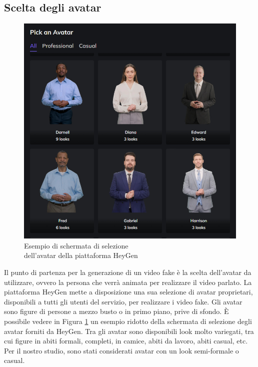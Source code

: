 
\subsection{Scelta degli avatar}

\begin{figure}[t]
    \centering
    \includegraphics[width=0.62\linewidth]{images/pick_avatar}
    \caption{Esempio di schermata di selezione\\ dell'avatar della piattaforma HeyGen}
    \label{fig:pick_avatar}
\end{figure}


Il punto di partenza per la generazione di un video fake è la scelta dell'avatar da utilizzare, ovvero la persona che verrà animata per realizzare il video parlato. La piattaforma HeyGen mette a disposizione una sua selezione di avatar proprietari, disponibili a tutti gli utenti del servizio, per realizzare i video fake. Gli avatar sono figure di persone a mezzo busto o in primo piano, prive di sfondo. È possibile vedere in Figura \ref{fig:pick_avatar} un esempio ridotto della schermata di selezione degli avatar forniti da HeyGen. Tra gli avatar sono disponibili look molto variegati, tra cui figure in abiti formali, completi, in camice, abiti da lavoro, abiti casual, etc. Per il nostro studio, sono stati considerati avatar con un look semi-formale o casual.

